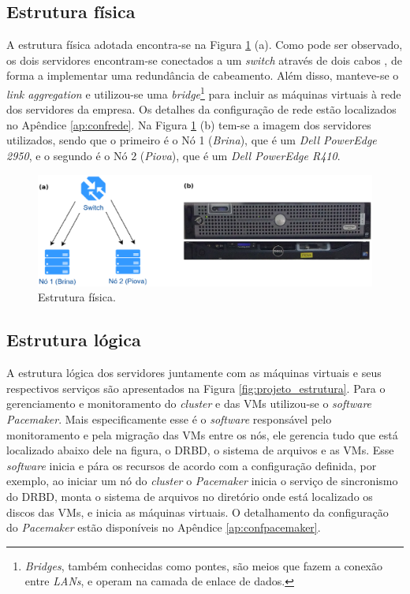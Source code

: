 \subsection{Estrutura física}

A estrutura física adotada encontra-se na Figura \ref{fig:projeto_fisico} (a). Como pode ser observado, os dois servidores encontram-se 
conectados a um \textit{switch} através de dois cabos , de forma a implementar uma redundância de cabeamento. Além disso, manteve-se o 
\textit{link aggregation} e utilizou-se uma \textit{bridge}\footnote[1]{\textit{Bridges}, também conhecidas como pontes, são meios que fazem a 
conexão entre \textit{LANs}, e operam na camada de enlace de dados.} para incluir as máquinas virtuais à rede dos servidores da empresa. 
Os detalhes da configuração de rede estão localizados no Apêndice \ref{ap:confrede}.
Na Figura \ref{fig:projeto_fisico} (b) tem-se a imagem dos servidores utilizados, sendo que o primeiro é o Nó 1 (\textit{Brina}), que é um 
\textit{Dell PowerEdge 2950}, e o segundo é o Nó 2 (\textit{Piova}), que é um \textit{Dell PowerEdge R410}.

\begin{figure}[h!]
 \centering
 \includegraphics[width=430px]{img/projeto_fisico.eps}
 \caption{Estrutura física.}
 \label{fig:projeto_fisico}
\end{figure}

\newpage
\subsection{Estrutura lógica}

A estrutura lógica dos servidores juntamente com as máquinas virtuais e seus respectivos serviços são apresentados na Figura 
\ref{fig:projeto_estrutura}. Para o gerenciamento e monitoramento do \textit{cluster} e das \acp{VM} utilizou-se o \textit{software} 
\textit{Pacemaker}. Mais especificamente esse é o \textit{software} responsável pelo monitoramento e pela migração das \acp{VM} entre os nós, 
ele gerencia tudo que está localizado abaixo dele na figura, o \ac{DRBD}, o sistema de arquivos e as \acp{VM}.
Esse \textit{software} inicia e pára os recursos de acordo com a configuração definida, por exemplo, ao iniciar um nó do \textit{cluster} o 
\textit{Pacemaker} inicia o serviço de sincronismo do \ac{DRBD}, monta o sistema de arquivos no diretório onde está localizado os 
discos das \acp{VM}, e inicia as máquinas virtuais. 
O detalhamento da configuração do \textit{Pacemaker} estão disponíveis no Apêndice \ref{ap:confpacemaker}.


